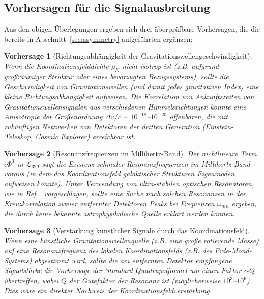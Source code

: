 \documentclass[12pt,a4paper]{article}
\newtheorem{prediction}{Vorhersage}
\begin{document}
	\subsection{Vorhersagen für die Signalausbreitung}
	
	Aus den obigen Überlegungen ergeben sich drei überprüfbare Vorhersagen, die die bereits in Abschnitt~\ref{sec:asymmetry} aufgeführten ergänzen:
	
	\begin{prediction}[Richtungsabhängigkeit der Gravitationswellengeschwindigkeit]
		Wenn die Koordinationsfelddichte \(\rho_K\) nicht isotrop ist (z.B. aufgrund großräumiger Struktur oder eines bevorzugten Bezugssystems), sollte die Geschwindigkeit von Gravitationswellen (und damit jedes gravitativen Index) eine kleine Richtungsabhängigkeit aufweisen. Die Korrelation von Ankunftszeiten von Gravitationswellensignalen aus verschiedenen Himmelsrichtungen könnte eine Anisotropie der Größenordnung \(\Delta v/c \sim 10^{-18}\)–\(10^{-20}\) offenbaren, die mit zukünftigen Netzwerken von Detektoren der dritten Generation (Einstein-Teleskop, Cosmic Explorer) erreichbar ist.
	\end{prediction}
	
	\begin{prediction}[Resonanzfrequenzen im Millihertz-Band]
		Der nichtlineare Term \(\epsilon \Phi^3\) in \(\mathcal{L}_{329}\) sagt die Existenz schmaler Resonanzfrequenzen im Millihertz-Band voraus (in dem das Koordinationsfeld galaktischer Strukturen Eigenmoden aufweisen könnte). Unter Verwendung von ultra-stabilen optischen Resonatoren, wie in Ref.~\cite{Barontini2025} vorgeschlagen, sollte eine Suche nach solchen Resonanzen in der Kreuzkorrelation zweier entfernter Detektoren Peaks bei Frequenzen \(\omega_{mn}\) ergeben, die durch keine bekannte astrophysikalische Quelle erklärt werden können.
	\end{prediction}
	
	\begin{prediction}[Verstärkung künstlicher Signale durch das Koordinationsfeld]
		Wenn eine künstliche Gravitationswellenquelle (z.B. eine große rotierende Masse) auf eine Resonanzfrequenz des lokalen Koordinationsfelds (z.B. des Erde-Mond-Systems) abgestimmt wird, sollte die am entfernten Detektor empfangene Signalstärke die Vorhersage der Standard-Quadrupolformel um einen Faktor \(\sim Q\) übertreffen, wobei \(Q\) der Gütefaktor der Resonanz ist (möglicherweise \(10^3\)–\(10^6\)). Dies wäre ein direkter Nachweis der Koordinationsfeldverstärkung.
	\end{prediction}
	
\end{document}

